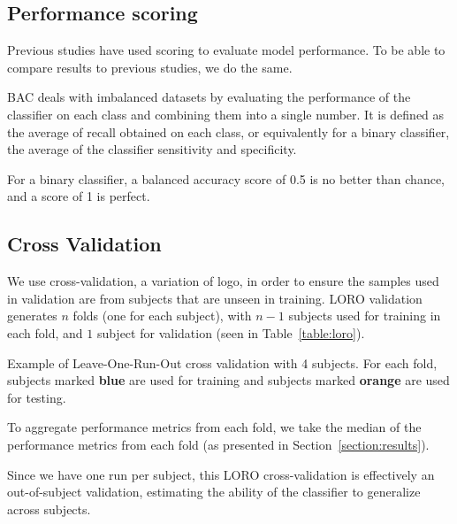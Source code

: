     \subsection{Performance scoring}\label{section:scoring}

        Previous studies have used  scoring to evaluate model performance. To be able to compare results to previous studies, we do the same. 

        BAC deals with imbalanced datasets by evaluating the performance of the classifier on each class and combining them into a single number. It is defined as the average of recall obtained on each class, or equivalently for a binary classifier, the average of the classifier sensitivity and specificity. 

        For a binary classifier, a balanced accuracy score of 0.5 is no better than chance, and a score of 1 is perfect.

    \subsection{Cross Validation}

        We use  cross-validation, a variation of \gls{logo}, in order to ensure the samples used in validation are from subjects that are unseen in training. LORO validation generates $n$ folds (one for each subject), with $n-1$ subjects used for training in each fold, and $1$ subject for validation (seen in Table~\ref{table:loro}).

        \begin{table}[h]
            \centering
            
            \caption{Example of Leave-One-Run-Out cross validation with 4 subjects. For each fold, subjects marked \textcolor{NavyBlue}{\textbf{blue}} are used for training and subjects marked \textcolor{BurntOrange}{\textbf{orange}} are used for testing.}\label{table:loro}
        \end{table}

        To aggregate performance metrics from each fold, we take the median of the performance metrics from each fold (as presented in Section~\ref{section:results}).

        Since we have one run per subject, this LORO cross-validation is effectively an out-of-subject validation, estimating the ability of the classifier to generalize across subjects.

